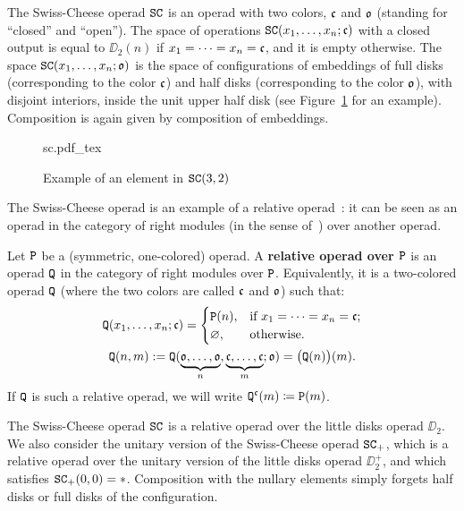 The Swiss-Cheese operad $\mathtt{SC}$  is an operad with two colors, $\mathfrak{c}$ and $\mathfrak{o}$ (standing for ``closed'' and ``open'').
The space of operations $\mathtt{SC}(x_{1}, \dots, x_{n}; \mathfrak{c})$ with a closed output is equal to $\DD_{2}(n)$ if $x_{1} = \dots = x_{n} = \mathfrak{c}$, and it is empty otherwise.
The space $\mathtt{SC}(x_{1}, \dots, x_{n}; \mathfrak{o})$ is the space of configurations of embeddings of full disks (corresponding to the color $\mathfrak{c}$) and half disks (corresponding to the color $\mathfrak{o}$), with disjoint interiors, inside the unit upper half disk (see Figure~\ref{sw.fig.exa-sc} for an example).
Composition is again given by composition of embeddings.

\begin{figure}[htbp]
  \centering
  \def\svgwidth{0.5\textwidth}
  {sc.pdf_tex}
  \caption{Example of an element in $\mathtt{SC}(3,2)$}
  \label{sw.fig.exa-sc}
\end{figure}

The Swiss-Cheese operad is an example of a relative operad~\cite{Voronov1999}: it can be seen as an operad in the category of right modules (in the sense of~\cite{Fresse2009}) over another operad.
\begin{definition}
  \label{sw.def.rel-op}
  Let $\mathtt{P}$ be a (symmetric, one-colored) operad.
  A \textbf{relative operad over $\mathtt{P}$}  is an operad $\mathtt{Q}$ in the category of right modules over $\mathtt{P}$.
  Equivalently, it is a two-colored operad $\mathtt{Q}$ (where the two colors are called $\mathfrak{c}$ and $\mathfrak{o}$) such that:
  \begin{gather*}
    \mathtt{Q}(x_{1}, \dots, x_{n}; \mathfrak{c}) =
    \begin{cases}
      \mathtt{P}(n), & \text{if } x_{1} = \dots = x_{n} = \mathfrak{c}; \\
      \varnothing, & \text{otherwise}.
    \end{cases}
    \\
    \mathtt{Q}(n,m) : = \mathtt{Q}(\underbrace{\mathfrak{o}, \dots,
      \mathfrak{o}}_{n}, \underbrace{\mathfrak{c}, \dots, \mathfrak{c}}_{m} ;
    \mathfrak{o}) = \bigl( \mathtt{Q}(n) \bigr)(m).
  \end{gather*}
  If $\mathtt{Q}$ is such a relative operad, we will write $\mathtt{Q}^{\mathfrak{c}}(m) \coloneqq \mathtt{P}(m)$.
\end{definition}

The Swiss-Cheese operad $\mathtt{SC}$ is a relative operad over the little disks operad $\DD_{2}$.
We also consider the unitary version of the Swiss-Cheese operad $\mathtt{SC}_{+}$, which is a relative operad over the unitary version of the little disks operad $\DD_{2}^{+}$, and which satisfies $\mathtt{SC}_{+}(0,0) = *$.
Composition with the nullary elements simply forgets half disks or full disks of the configuration.

